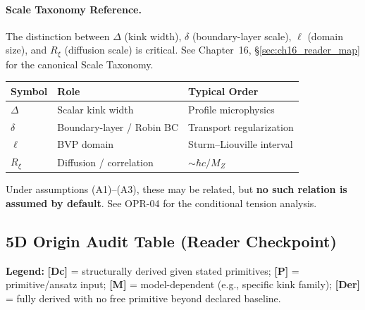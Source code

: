 \paragraph{Scale Taxonomy Reference.}
The distinction between $\Delta$ (kink width), $\delta$ (boundary-layer scale), $\ell$ (domain size),
and $R_\xi$ (diffusion scale) is critical. See Chapter~16, \S\ref{sec:ch16_reader_map} for the
canonical Scale Taxonomy.

\begin{tcolorbox}[colback=red!5!white, colframe=red!50!black,
    title=\textbf{Common Pitfall: Do Not Confuse These Scales}]
\begin{center}
\begin{tabular}{lll}
\toprule
\textbf{Symbol} & \textbf{Role} & \textbf{Typical Order} \\
\midrule
$\Delta$ & Scalar kink width & Profile microphysics \\
$\delta$ & Boundary-layer / Robin BC & Transport regularization \\
$\ell$ & BVP domain & Sturm--Liouville interval \\
$R_\xi$ & Diffusion / correlation & $\sim \hbar c / M_Z$ \\
\bottomrule
\end{tabular}
\end{center}
Under assumptions (A1)--(A3), these may be related, but \textbf{no such relation is assumed by default}.
See OPR-04 for the conditional tension analysis.
\end{tcolorbox}

\subsection{5D Origin Audit Table (Reader Checkpoint)}
\label{sec:ch20_5d_origin_audit}

\noindent\textbf{Legend:} \textbf{[Dc]} = structurally derived given stated primitives; \textbf{[P]} = primitive/ansatz input; \textbf{[M]} = model-dependent (e.g., specific kink family); \textbf{[Der]} = fully derived with no free primitive beyond declared baseline.

